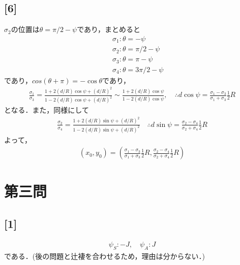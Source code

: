\documentclass[12pt,dvipdfmx]{jsarticle}
\begin{document}
\subsection*{\large{[6]}}
$\sigma_2$の位置は$\theta=\pi/2-\psi$であり，まとめると
\begin{eqnarray}
  &&\sigma_1 : \theta=-\psi\\
  &&\sigma_2 : \theta=\pi/2-\psi\\
  &&\sigma_3 : \theta=\pi-\psi\\
  &&\sigma_4 : \theta=3\pi/2-\psi
\end{eqnarray}
であり，$cos(\theta+\pi)=-\cos\theta$であり，
\begin{eqnarray}
  \frac{\sigma_1}{\sigma_3} = \frac{1+2(d/R)\cos\psi + (d/R)^2}{1-2(d/R)\cos\psi + (d/R)^2} \sim \frac{1+2(d/R)\cos\psi}{1-2(d/R)\cos\psi},\quad\therefore d\cos\psi= \frac{\sigma_1-\sigma_3}{\sigma_1+\sigma_3}\frac{1}{2}R
\end{eqnarray}
となる．また，同様にして
\begin{eqnarray}
  \frac{\sigma_2}{\sigma_4} = \frac{1+2(d/R)\sin\psi + (d/R)^2}{1-2(d/R)\sin\psi + (d/R)^2}\quad\therefore d\sin\psi= \frac{\sigma_2-\sigma_4}{\sigma_2+\sigma_4}\frac{1}{2}R 
\end{eqnarray}
よって，
\begin{eqnarray}
  (x_0,y_0) = \left( \frac{\sigma_1-\sigma_3}{\sigma_1+\sigma_3}\frac{1}{2}R, \frac{\sigma_2-\sigma_4}{\sigma_2+\sigma_4}\frac{1}{2}R  \right)
\end{eqnarray}
\newpage
\section*{\Large{第三問}}
\subsection*{\large{[1]}}
\begin{eqnarray}
  \psi_S: -J ,\quad \psi_A: J
\end{eqnarray}
である．(後の問題と辻褄を合わせるため，理由は分からない．)
\end{document}
